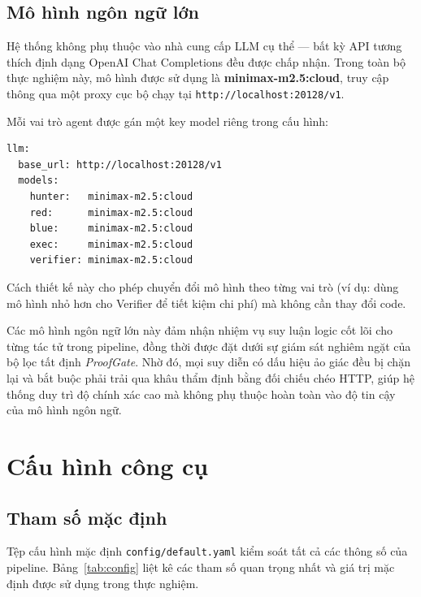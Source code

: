\subsection{Mô hình ngôn ngữ lớn}

Hệ thống không phụ thuộc vào nhà cung cấp LLM cụ thể --- bất kỳ API tương thích định dạng OpenAI Chat Completions đều được chấp nhận. Trong toàn bộ thực nghiệm này, mô hình được sử dụng là \textbf{minimax-m2.5:cloud}, truy cập thông qua một proxy cục bộ chạy tại \texttt{http://localhost:20128/v1}.

Mỗi vai trò agent được gán một key model riêng trong cấu hình:

\begin{verbatim}
llm:
  base_url: http://localhost:20128/v1
  models:
    hunter:   minimax-m2.5:cloud
    red:      minimax-m2.5:cloud
    blue:     minimax-m2.5:cloud
    exec:     minimax-m2.5:cloud
    verifier: minimax-m2.5:cloud
\end{verbatim}

Cách thiết kế này cho phép chuyển đổi mô hình theo từng vai trò (ví dụ: dùng mô hình nhỏ hơn cho Verifier để tiết kiệm chi phí) mà không cần thay đổi code.

Các mô hình ngôn ngữ lớn này đảm nhận nhiệm vụ suy luận logic cốt lõi cho từng tác tử trong pipeline, đồng thời được đặt dưới sự giám sát nghiêm ngặt của bộ lọc tất định \textit{ProofGate}. Nhờ đó, mọi suy diễn có dấu hiệu ảo giác đều bị chặn lại và bắt buộc phải trải qua khâu thẩm định bằng đối chiếu chéo HTTP, giúp hệ thống duy trì độ chính xác cao mà không phụ thuộc hoàn toàn vào độ tin cậy của mô hình ngôn ngữ.

\section{Cấu hình công cụ}
\label{sec:config}

\subsection{Tham số mặc định}

Tệp cấu hình mặc định \texttt{config/default.yaml} kiểm soát tất cả các thông số của pipeline. Bảng~\ref{tab:config} liệt kê các tham số quan trọng nhất và giá trị mặc định được sử dụng trong thực nghiệm.

